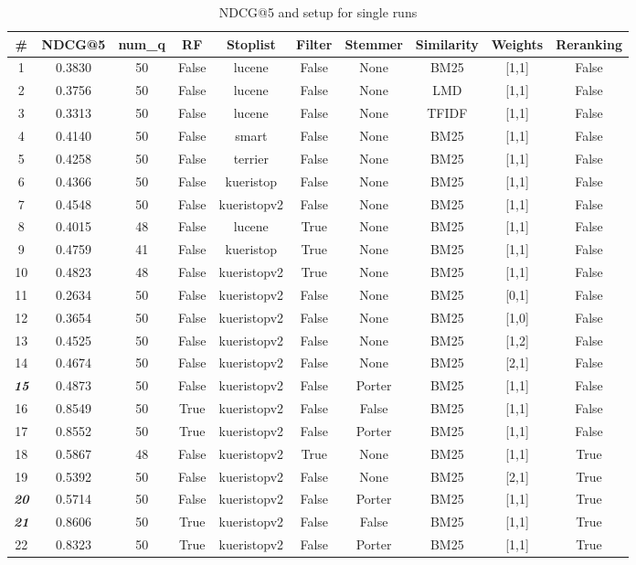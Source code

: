 \begin{table}[t]
	\caption{NDCG@5 and setup for single runs}
	\label{tab:results-table}
	\centering
	\begin{tabular}{|c||c|c||c|c|c|c|c|c|c|}
		\toprule
		\# & NDCG@5 & num\_q  & RF & Stoplist & Filter & Stemmer & Similarity & Weights & Reranking \\
		\midrule
		1 & 0.3830 & 50 & False & lucene & False & None & BM25 & [1,1] & False \\
		2 & 0.3756 & 50 & False & lucene & False & None & LMD & [1,1] & False \\
		3 & 0.3313 & 50 & False & lucene & False & None & TFIDF & [1,1] & False \\
		\hline
		4 & 0.4140 & 50 & False & smart & False & None & BM25 & [1,1] & False \\
		5 & 0.4258 & 50 & False & terrier & False & None & BM25 & [1,1] & False \\
		6 & 0.4366 & 50 & False & kueristop & False & None & BM25 & [1,1] & False \\
		7 & 0.4548 & 50 & False & kueristopv2 & False & None & BM25 & [1,1] & False \\
		\hline
		8 & 0.4015 & 48 & False & lucene & True & None & BM25 & [1,1] & False \\
		9 & 0.4759 & 41 & False & kueristop & True & None & BM25 & [1,1] & False \\
		10 & 0.4823 & 48 & False & kueristopv2 & True & None & BM25 & [1,1] & False \\
		\hline
		11 & 0.2634 & 50 & False & kueristopv2 & False & None & BM25 & [0,1] & False \\
		12 & 0.3654 & 50 & False & kueristopv2 & False & None & BM25 & [1,0] & False \\
		13 & 0.4525 & 50 & False & kueristopv2 & False & None & BM25 & [1,2] & False \\
		14 & 0.4674 & 50 & False & kueristopv2 & False & None & BM25 & [2,1] & False \\
		\hline
		\textit{\textbf{15}} & 0.4873 & 50 & False & kueristopv2 & False & Porter & BM25 & [1,1] & False \\
		\hline
		16 & 0.8549 & 50 & True & kueristopv2 & False & False & BM25 & [1,1] & False \\
		17 & 0.8552 & 50 & True & kueristopv2 & False & Porter & BM25 & [1,1] & False \\
		\hline
		18 & 0.5867 & 48 & False & kueristopv2 & True & None & BM25 & [1,1] & True \\
		19 & 0.5392 & 50 & False & kueristopv2 & False & None & BM25 & [2,1] & True \\
		\textit{\textbf{20}} & 0.5714 & 50 & False & kueristopv2 & False & Porter & BM25 & [1,1] & True \\
		\textit{\textbf{21}} & 0.8606 & 50 & True & kueristopv2 & False & False & BM25 & [1,1] & True \\
		22 & 0.8323 & 50 & True & kueristopv2 & False & Porter & BM25 & [1,1] & True \\
		\bottomrule
	\end{tabular}
\end{table}

